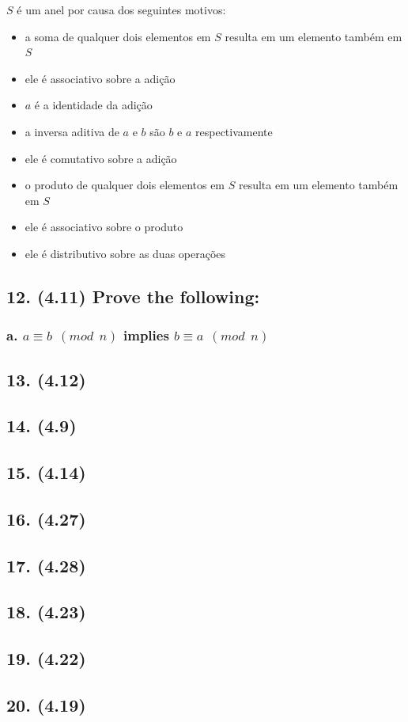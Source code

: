 \documentclass[fleqn, 12pt]{article}
\begin{document}
  $S$ é um anel por causa dos seguintes motivos:
  \begin{itemize}
    \item a soma de qualquer dois elementos em $S$ resulta em um elemento também em $S$
    \item ele é associativo sobre a adição
    \item $a$ é a identidade da adição
    \item a inversa aditiva de $a$ e $b$ são $b$ e $a$ respectivamente
    \item ele é comutativo sobre a adição
    \item o produto de qualquer dois elementos em $S$ resulta em um elemento também em $S$
    \item ele é associativo sobre o produto
    \item ele é distributivo sobre as duas operações
  \end{itemize}

\subsection*{12. (4.11) Prove the following:}

\subsubsection*{a. $a \equiv b \ \ (mod \ \ n)$ implies $b \equiv a \ \ (mod \ \ n)$}

\subsection*{13. (4.12)}

\subsection*{14. (4.9)}

\subsection*{15. (4.14)}

\subsection*{16. (4.27)}

\subsection*{17. (4.28)}

\subsection*{18. (4.23)}

\subsection*{19. (4.22)}

\subsection*{20. (4.19)}
\end{document}
